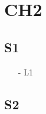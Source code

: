 \chapter{CH2}
\label{chap:2}



\section{S1}

\begin{itemize}
\item [-] L1
\end{itemize}

\section{S2}

